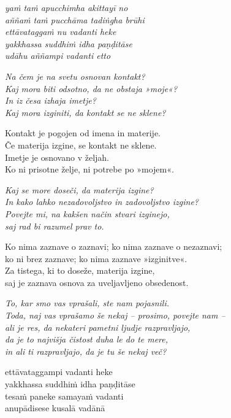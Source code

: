 \emph{yaṁ taṁ apucchimha akittayī no}\\
\emph{aññaṁ taṁ pucchāma tadiṅgha brūhi}\\
\emph{ettāvataggaṁ nu vadanti heke}\\
\emph{yakkhassa suddhiṁ idha paṇḍitāse}\\
\emph{udāhu aññampi vadanti etto}


\clearpage

\emph{Na čem je na svetu osnovan kontakt?\\
Kaj mora biti odsotno, da ne obstaja »moje«?}\\
\emph{In iz česa izhaja imetje?}\\
\emph{Kaj mora izginiti, da kontakt se ne sklene?}

Kontakt je pogojen od imena in materije.\\
Če materija izgine, se kontakt ne sklene.\\
Imetje je osnovano v željah.\\
Ko ni prisotne želje, ni potrebe po »mojem«.

\emph{Kaj se more doseči, da materija izgine?}\\
\emph{In kako lahko nezadovoljstvo in zadovoljstvo izgine?}\\
\emph{Povejte mi, na kakšen način stvari izginejo,}\\
\emph{saj rad bi razumel prav to.}

Ko nima zaznave o zaznavi; ko nima zaznave o nezaznavi;\\
ko ni brez zaznave; ko nima zaznave »izginitve«.\\
Za tistega, ki to doseže, materija izgine,\\
saj je zaznava osnova za uveljavljeno obsedenost.

\emph{To, kar smo vas vprašali, ste nam pojasnili.}\\
\emph{Toda, naj vas vprašamo še nekaj -- prosimo, povejte nam --}\\
\emph{ali je res, da nekateri pametni ljudje razpravljajo,}\\
\emph{da je to najvišja čistost duha le do te mere,}\\
\emph{in ali ti razpravljajo, da je tu še nekaj več?}


\clearpage

ettāvataggampi vadanti heke\\
yakkhassa suddhiṁ idha paṇḍitāse\\
tesaṁ paneke samayaṁ vadanti\\
anupādisese kusalā vadānā

